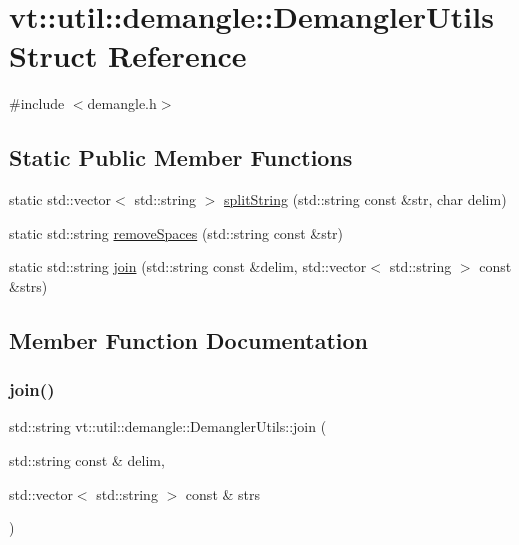 \hypertarget{structvt_1_1util_1_1demangle_1_1_demangler_utils}{}\section{vt\+:\+:util\+:\+:demangle\+:\+:Demangler\+Utils Struct Reference}
\label{structvt_1_1util_1_1demangle_1_1_demangler_utils}


{\ttfamily \#include $<$demangle.\+h$>$}

\subsection*{Static Public Member Functions}
\begin{DoxyCompactItemize}
\item 
static std\+::vector$<$ std\+::string $>$ \hyperlink{structvt_1_1util_1_1demangle_1_1_demangler_utils_a3c280c288503a3420483e6705cddf5fb}{split\+String} (std\+::string const \&str, char delim)
\item 
static std\+::string \hyperlink{structvt_1_1util_1_1demangle_1_1_demangler_utils_a2e57c8080f9296b2ce137c622718d7bb}{remove\+Spaces} (std\+::string const \&str)
\item 
static std\+::string \hyperlink{structvt_1_1util_1_1demangle_1_1_demangler_utils_a8933d7b4e4995e49e13bb632bec61b50}{join} (std\+::string const \&delim, std\+::vector$<$ std\+::string $>$ const \&strs)
\end{DoxyCompactItemize}


\subsection{Member Function Documentation}
\mbox{\label{structvt_1_1util_1_1demangle_1_1_demangler_utils_a8933d7b4e4995e49e13bb632bec61b50}} 
\subsubsection{\texorpdfstring{join()}{join()}}
{\footnotesize\ttfamily std\+::string vt\+::util\+::demangle\+::\+Demangler\+Utils\+::join (\begin{DoxyParamCaption}\item[{std\+::string const \&}]{delim,  }\item[{std\+::vector$<$ std\+::string $>$ const \&}]{strs }\end{DoxyParamCaption})\hspace{0.3cm}{\ttfamily [static]}}

